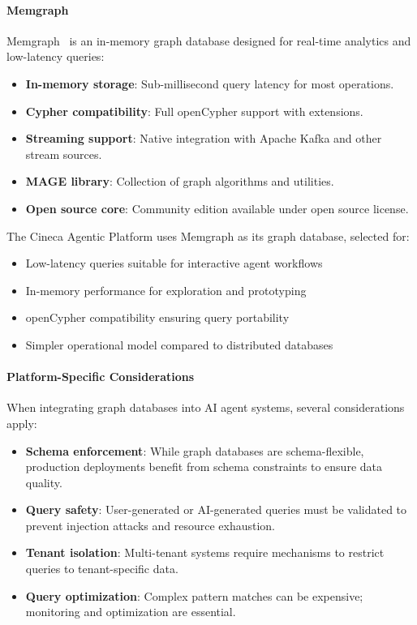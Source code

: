 \documentclass[a4paper,twoside]{sapthesis}
\begin{document}
\paragraph{Memgraph}

Memgraph~\cite{memgraph2023}
is an in-memory graph database designed for real-time analytics and low-latency queries:
\begin{itemize}
    \item \textbf{In-memory storage}: Sub-millisecond query latency for most operations.
    \item \textbf{Cypher compatibility}: Full openCypher support with extensions.
    \item \textbf{Streaming support}: Native integration with Apache Kafka and other stream sources.
    \item \textbf{MAGE library}: Collection of graph algorithms and utilities.
    \item \textbf{Open source core}: Community edition available under open source license.
\end{itemize}

The Cineca Agentic Platform uses Memgraph as its graph database, selected for:
\begin{itemize}
    \item Low-latency queries suitable for interactive agent workflows
    \item In-memory performance for exploration and prototyping
    \item openCypher compatibility ensuring query portability
    \item Simpler operational model compared to distributed databases
\end{itemize}

\paragraph{Platform-Specific Considerations}

When integrating graph databases into AI agent systems, several considerations apply:

\begin{itemize}
    \item \textbf{Schema enforcement}: While graph databases are schema-flexible, production deployments benefit from schema constraints to ensure data quality.
    
    \item \textbf{Query safety}: User-generated or AI-generated queries must be validated to prevent injection attacks and resource exhaustion.
    
    \item \textbf{Tenant isolation}: Multi-tenant systems require mechanisms to restrict queries to tenant-specific data.
    
    \item \textbf{Query optimization}: Complex pattern matches can be expensive; monitoring and optimization are essential.
\end{itemize}
\end{document}

